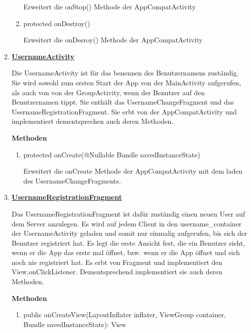\begin{enumerate}
\begin{enumerate}
		Erweitert die onStop() Methode der AppCompatActivity %
		
		\item protected onDestroy()

		Erweitert die onDesroy() Methode der AppCompatActivity %
	\end{enumerate}
	
	\item \textbf{\underline{UsernameActivity}}
	
	Die UsernameActivity ist für das benennen des Benutzernamens zuständig. Sie wird sowohl zum ersten Start der App von der MainActivity aufgerufen, als auch von von der GroupActivity, wenn der Benutzer auf den Benutzernamen tippt. Sie enthält das UsernameChangeFragment und das UsernameRegistrationFragment. Sie erbt von der AppCompatActivity und implementiert dementsprechen auch deren Methoden.
	
	\textbf{Methoden}
	
	\begin{enumerate}
		\item protected onCreate(@Nullable Bundle savedInstanceState)
		
		Erweitert die onCreate Methode der AppCompatActivity mit dem laden des UsernameChangeFragments.
	\end{enumerate}
	
	\item \textbf{\underline{UsernameRegistrationFragment}}
	
	Das UsernameRegistrationFragment ist dafür zuständig einen neuen User auf dem Server anzulegen. Es wird auf jedem Client in den username\_container der UsernameActivity geladen und somit nur einmalig aufgerufen, bis sich der Benutzer registriert hat. Es legt die erste Ansicht fest, die ein Benutzer sieht, wenn er die App das erste mal öffnet, bzw. wenn er die App öffnet und sich noch nie registriert hat. Es erbt von Fragment und implementiert den View.onClickListener. Dementsprechend implementiert sie auch deren Methoden.
	
	\textbf{Methoden}
	
	\begin{enumerate}
		\item public onCreateView(LayoutInflater inflater, ViewGroup container, Bundle savedInstanceState): View


\end{enumerate}
\end{enumerate}
